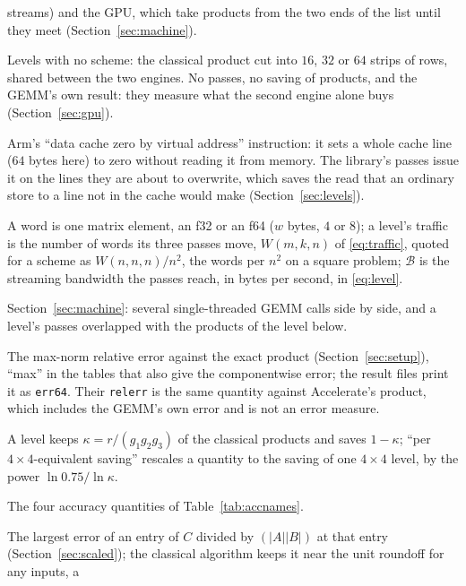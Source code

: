 \documentclass[11pt]{article}
\newcommand{\lv}[1]{\texttt{#1}}
\begin{document}
\begin{description}
  streams) and the GPU, which take products from the two ends of the list
  until they meet (Section~\ref{sec:machine}).
\item[\lv{K16}, \lv{K32}, \lv{K64}.]  Levels with no scheme: the classical
  product cut into $16$, $32$ or $64$ strips of rows, shared between the two
  engines.  No passes, no saving of products, and the GEMM's own result:
  they measure what the second engine alone buys (Section~\ref{sec:gpu}).
\item[\texttt{DC ZVA}.]  Arm's ``data cache zero by virtual address''
  instruction: it sets a whole cache line ($64$ bytes here) to zero without
  reading it from memory.  The library's passes issue it on the lines they
  are about to overwrite, which saves the read that an ordinary store to a
  line not in the cache would make (Section~\ref{sec:levels}).
\item[Word, traffic, $\mathcal{B}$.]  A word is one matrix element, an f32 or
  an f64 ($w$ bytes, $4$ or $8$); a level's traffic is the number of words its
  three passes move, $W(m,k,n)$ of \eqref{eq:traffic}, quoted for a scheme as
  $W(n,n,n)/n^2$, the words per $n^2$ on a square problem; $\mathcal{B}$ is the
  streaming bandwidth the passes reach, in bytes per second, in
  \eqref{eq:level}.
\item[Streams, pipelines.]  Section~\ref{sec:machine}: several
  single-threaded GEMM calls side by side, and a level's passes overlapped
  with the products of the level below.
\item[Error, max.]  The max-norm relative error against the exact product (Section~\ref{sec:setup}), ``max'' in the tables that also give the componentwise error; the result files print it as \texttt{err64}.  Their \texttt{relerr} is the same quantity against Accelerate's product, which includes the GEMM's own error and is not an error measure.
\item[Kept fraction $\kappa$, saving.]  A level keeps $\kappa=r/(g_1g_2g_3)$ of the classical products and saves $1-\kappa$; ``per $4\times4$-equivalent saving'' rescales a quantity to the saving of one $4\times4$ level, by the power $\ln0.75/\ln\kappa$.
\item[Amplification ratio, growth factor, level factor, error growth.]  The four accuracy quantities of Table~\ref{tab:accnames}.
\item[cw, componentwise error.]  The largest error of an entry of $C$
  divided by $(|A||B|)$ at that entry (Section~\ref{sec:scaled}); the
  classical algorithm keeps it near the unit roundoff for any inputs, a

\end{description}
\end{document}
